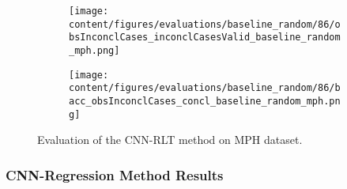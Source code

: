 

\begin{figure}[t]
  \begin{subfigure}{0.9\textwidth}
    \centering
    \texttt{[image: content/figures/evaluations/baseline\_random/86/obsInconclCases\_inconclCasesValid\_baseline\_random\_mph.png]}
    \label{fig:obsInconclCases_inconclCasesValid_baseline_random_mph}
  \end{subfigure}
  \hfill
  \begin{subfigure}{0.9\textwidth}
    \centering
    \texttt{[image: content/figures/evaluations/baseline\_random/86/bacc\_obsInconclCases\_concl\_baseline\_random\_mph.png]}
    \label{fig:bacc_obsInconclCases_concl_baseline_random_mph}
  \end{subfigure}
  \caption{Evaluation of the CNN-RLT method on MPH dataset.}
\end{figure}


\subsubsection{CNN-Regression Method Results}
\label{subsubsec:eval_regression}





